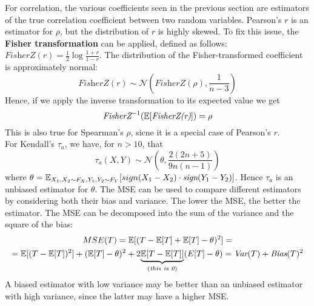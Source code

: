 For correlation, the various coefficients seen in the previous section are estimators of the true correlation coefficient between two random variables. Pearson's $r$ is an estimator for $\rho$, but the distribution of $r$ is highly skewed. To fix this issue, the \textbf{Fisher transformation} can be applied, defined as follows: $\textit{FisherZ}(r) = \frac{1}{2} \log\frac{1+r}{1-r}$. The distribution of the Fisher-transformed coefficient is approximately normal:
\begin{equation*}
    \textit{FisherZ}(r) \sim \mathcal{N}\left(\textit{FisherZ}(\rho), \frac{1}{n-3}\right)
\end{equation*}   
Hence, if we apply the inverse transformation to its expected value we get
\begin{equation*}
    \textit{FisherZ}^{-1} (\mathbb{E}[\textit{FisherZ(r)}]) = \rho
\end{equation*}   
This is also true for Spearman's $\rho$, sicne it is a special case of Pearson's $r$. \\
For Kendall's $\tau_a$, we have, for $n > 10$, that
\begin{equation*}
    \tau_a (X,Y) \sim \mathcal{N}\left(\theta, \frac{2(2n + 5)}{9n(n-1)}\right)
\end{equation*}   
where $\theta = \mathbb{E}_{X_1,X_2 \sim F_X, Y_1, Y_2 \sim F_Y}[sign(X_1 - X_2) \cdot \textit{sign}(Y_1 - Y_2)]$. Hence $\tau_a$ is an unbiased estimator for $\theta$.
The MSE can be used to compare different estimators by considering both their bias and variance. The lower the MSE, the better the estimator. The MSE can be decomposed into the sum of the variance and the square of the bias:
\begin{gather*}
    MSE(T) = \mathbb{E}[(T - \mathbb{E}[T] + \mathbb{E}[T] - \theta)^2] =\\
    = \mathbb{E}[(T - \mathbb{E}[T])^2] + (\mathbb{E}[T] - \theta)^2 + 2\underset{(\textit{this is 0})}{\underbrace{{\mathbb{E}[T - \mathbb{E}[T]]}}}(E[T]- \theta) = \textit{Var}(T) + \textit{Bias}(T)^2
\end{gather*}
A biased estimator with low variance may be better than an unbiased estimator with high variance, since the latter may have a higher MSE.

